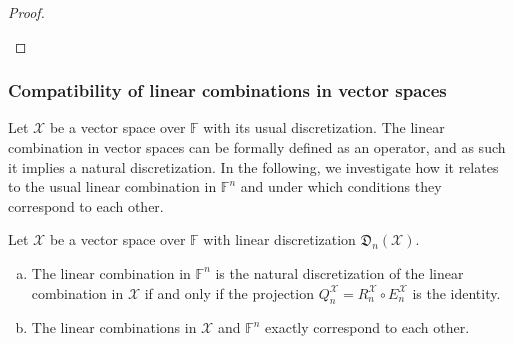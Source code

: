\documentclass[a4paper]{paper}
\newcommand{\Discr}{\mathfrak{D}}
\newcommand{\Spc}[1]{\mathscr{#1}}
\newcommand{\Field}{\mathbb{F}}
\newcommand*{\EXT}[2]{\ensuremath{E_{#1}^{#2}}}
\newcommand*{\REST}[2]{\ensuremath{R_{#1}^{#2}}}
\newcommand*{\COPROJ}[2]{\ensuremath{Q_{#1}^{#2}}}
\newcommand*{\RnX}{\ensuremath{\REST{n}{\Spc{X}}}}
\newcommand*{\EnX}{\ensuremath{\EXT{n}{\Spc{X}}}}
\newcommand*{\QnX}{\ensuremath{\COPROJ{n}{\Spc{X}}}}
\begin{document}
\begin{proof}
\begin{enumerate}[a)]
 \end{enumerate}
\end{proof}



\subsubsection{Compatibility of linear combinations in vector spaces}

Let $\Spc{X}$ be a vector space over $\Field$ with its usual discretization. The linear combination in vector spaces 
can be formally defined as an operator, and as such it implies a natural discretization. In the following, we 
investigate how it relates to the usual linear combination in $\Field^n$ and under which conditions they correspond to 
each other.

\begin{lemma}
 Let $\Spc{X}$ be a vector space over $\Field$ with linear discretization $\Discr_{n}(\Spc{X})$.
 \begin{enumerate}[(a)]
  \item The linear combination in $\Field^n$ is the natural discretization of the linear combination in $\Spc{X}$ if 
  and only if the projection $\QnX = \RnX \circ \EnX$ is the identity.
  
  \item The linear combinations in $\Spc{X}$ and $\Field^n$ exactly correspond to each other.
 \end{enumerate}
\end{lemma}
\end{document}
